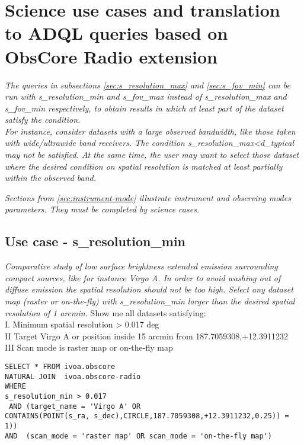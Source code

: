 \section{Science use cases and translation to ADQL queries  based on ObsCore Radio extension  }
\label{ADQLusecases}


\textit{ The  queries in subsections \ref{sec:s_resolution_max} and \ref{sec:s_fov_min}
can be run with s\_resolution\_min and s\_fov\_max instead of s\_resolution\_max and 
 s\_fov\_min respectively, to obtain results in which at least part of the dataset satisfy the condition.\\
For instance, consider datasets with a large observed bandwidth, like those taken with wide/ultrawide band receivers.
The condition s\_resolution\_max<d\_typical may not be satisfied. At the same time, the user may want to select those 
dataset where the desired condition on spatial resolution is matched at least partially  within the observed band.}

\textit{Sections from \ref{sec:instrument-mode} illustrate instrument and observing modes parameters. They must  be completed by science cases.}

\subsection{Use case - s\_resolution\_min}
\label{sec:s_resolution_min}
\textit{Comparative study of low surface brightness extended emission surrounding compact sources, like for instance Virgo A.
In order to avoid washing out of diffuse emission the spatial resolution should not be too high.
Select any dataset map (raster or on-the-fly) with s\_resolution\_min larger than the desired spatial resolution of 1 arcmin.}
Show me all datasets satisfying: \\
I. Minimum spatial resolution > 0.017 deg \\
II Target Virgo A or position inside 15 arcmin from 187.7059308,+12.3911232 \\
III Scan mode is raster map or on-the-fly map

\begin{verbatim}
SELECT * FROM ivoa.obscore
NATURAL JOIN  ivoa.obscore-radio 
WHERE
s_resolution_min > 0.017 
 AND (target_name = 'Virgo A' OR
CONTAINS(POINT(s_ra, s_dec),CIRCLE,187.7059308,+12.3911232,0.25)) = 1)) 
AND  (scan_mode = 'raster map' OR scan_mode = 'on-the-fly map')
\end{verbatim}

